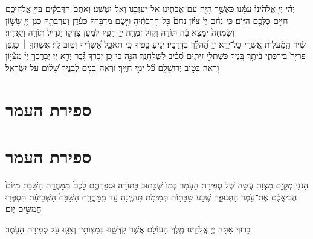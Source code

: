 \documentclass[twoside, openany, parskip=half, 11pt]{book}
\begin{document}
\begin{footnotesize}
%
יְהִ֨י יְיָ֤ אֱלֹהֵ֙ינוּ֙ עִמָּ֔נוּ כַּאֲשֶׁ֥ר הָיָ֖ה עִם־אֲבֹתֵ֑ינוּ אַל־יַעַזְבֵ֖נוּ וְאַֽל־יִטְּשֵֽׁנוּ׃
%
וְאַתֶּם֙ הַדְּבֵקִ֔ים בַּייָ֖ אֱלֹהֵיכֶ֑ם חַיִּ֥ים כֻּלְּכֶ֖ם הַיּֽוֹם׃
%
כִּֽי־נִחַ֨ם יְיָ֜ צִיּ֗וֹן נִחַם֙ כׇּל־חׇרְבֹתֶ֔יהָ וַיָּ֤שֶׂם מִדְבָּרָהּ֙ כְּעֵ֔דֶן וְעַרְבָתָ֖הּ כְּגַן־יְיָ֑ שָׂשׂ֤וֹן וְשִׂמְחָה֙ יִמָּ֣צֵא בָ֔הּ תּוֹדָ֖ה וְק֥וֹל זִמְרָֽה׃
%
יְיָ֥ חָפֵ֖ץ לְמַ֣עַן צִדְק֑וֹ יַגְדִּ֥יל תּוֹרָ֖ה וְיַאְדִּֽיר׃\\
%
שִׁ֗יר הַֽמַּ֫עֲל֥וֹת אַ֭שְׁרֵי כׇּל־יְרֵ֣א יְיָ֑ הַ֝הֹלֵ֗ךְ בִּדְרָכָֽיו׃
יְגִ֣יעַ כַּ֭פֶּיךָ כִּ֣י תֹאכֵ֑ל אַ֝שְׁרֶ֗יךָ וְט֣וֹב לָֽךְ׃
אֶשְׁתְּךָ֤ ׀ כְּגֶ֥פֶן פֹּרִיָּה֮ בְּיַרְכְּתֵ֢י בֵ֫יתֶ֥ךָ בָּ֭נֶיךָ כִּשְׁתִלֵ֣י זֵיתִ֑ים סָ֝בִ֗יב לְשֻׁלְחָנֶֽךָ׃
הִנֵּ֣ה כִי־כֵ֭ן יְבֹ֥רַךְ גָּ֗בֶר יְרֵ֣א יְיָ׃
יְבָרֶכְךָ֥ יְיָ֗ מִצִּ֫יּ֥וֹן וּ֭רְאֵה בְּט֣וּב יְרוּשָׁלָ֑‍ִם כֹּ֗֝ל יְמֵ֣י חַיֶּֽיךָ׃
וּרְאֵֽה־בָנִ֥ים לְבָנֶ֑יךָ שָׁ֝ל֗וֹם עַל־יִשְׂרָאֵֽל׃
\end{footnotesize}
\section[ספירת העמר]{ ספירת העמר }
\section{ספירת העמר}
\label{sefiras haomer}

הִנְנִי מְקַיֵּם מִצְוַת עֲשֵה שֶׁל סְפִירַת הָעֽׂמֶר כְּמוׂ שֶׁכָּתוּב בַּתּוׂרָה׃ וּסְפַרְתֶּ֤ם לָכֶם֙ מִמׇּחֳרַ֣ת הַשַּׁבָּ֔ת מִיּוֹם֙ הֲבִ֣יאֲכֶ֔ם אֶת־עֹ֖מֶר הַתְּנוּפָ֑ה שֶׁ֥בַע שַׁבָּת֖וֹת תְּמִימֹ֥ת תִּהְיֶֽינָה׃ עַ֣ד מִֽמׇּחֳרַ֤ת הַשַּׁבָּת֙ הַשְּׁבִיעִ֔ת תִּסְפְּר֖וּ חֲמִשִּׁ֣ים י֑וֹם׃

בָּרוּךְ אַתָּה יְיָ אֱלֹהֵֽינוּ מֶֽלֶךְ הָעוֹלָם אֲשֶׁר קִדְּשָֽׁנוּ בְּמִצְוֹתָיו וְצִוָּֽנוּ עַל סְפִירַת הָעֹֽמֶר׃\\
\end{document}
